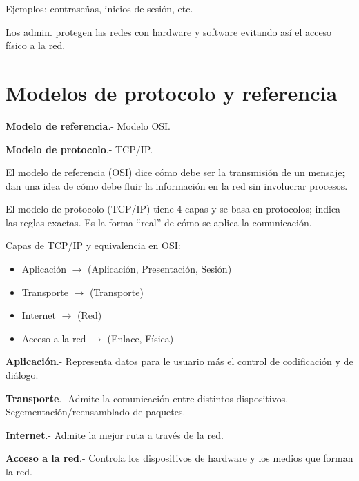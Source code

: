 \documentclass{article}
\begin{document}
Ejemplos: contraseñas, inicios de sesión, etc.
\vspace{1em}

Los admin. protegen las redes con hardware y software evitando así el acceso
físico a la red.
\vspace{1em}


\section{Modelos de protocolo y referencia}

\textbf{Modelo de referencia}.- Modelo OSI.
\vspace{1em}

\textbf{Modelo de protocolo}.- TCP/IP.
\vspace{1em}

El modelo de referencia (OSI) dice cómo debe ser la transmisión de un mensaje;
dan una idea de cómo debe fluir la información en la red sin involucrar procesos.
\vspace{1em}

El modelo de protocolo (TCP/IP) tiene 4 capas y se basa en protocolos; indica las reglas
exactas. Es la forma ``real'' de cómo se aplica la comunicación.
\vspace{1em}

Capas de TCP/IP y equivalencia en OSI:

\begin{itemize}
	\item
	Aplicación $\rightarrow$ (Aplicación, Presentación, Sesión)
	\item
	Transporte $\rightarrow$ (Transporte)
	\item
	Internet  $\rightarrow$ (Red)
	\item
	Acceso a la red $\rightarrow$ (Enlace, Física)
\end{itemize}
\vspace{1em}

\textbf{Aplicación}.- Representa datos para le usuario más el control de codificación
y de diálogo.
\vspace{1em}

\textbf{Transporte}.- Admite la comunicación entre distintos dispositivos.
Segementación/reensamblado de paquetes.
\vspace{1em}

\textbf{Internet}.- Admite la mejor ruta a través de la red.
\vspace{1em}

\textbf{Acceso a la red}.- Controla los dispositivos de hardware y los medios
que forman la red.
\vspace{1em}
\end{document}
